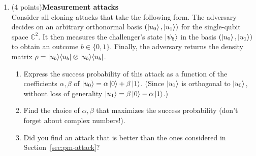 \documentclass[12pt]{article}
\begin{document}
\begin{enumerate}
\item (4 points){\bf Measurement attacks}\\
Consider all cloning attacks that take the following form. The adversary decides on an arbitrary orthonormal basis $(\ket{u_0},\ket{u_1})$ for the single-qubit space $\mathbb{C}^2$. It then measures the challenger's state $\ket{\psi_\$}$ in the basis $(\ket{u_0},\ket{u_1})$ to obtain an outcome $b\in\{0,1\}$. Finally, the adversary returns the density matrix $\rho = \ket{u_b}\!\bra{u_b}\otimes \ket{u_b}\!\bra{u_b}$. 
\begin{enumerate}
\item Express the success probability of this attack as a function of the coefficients $\alpha,\beta$ of $\ket{u_0} = \alpha \ket{0} + \beta\ket{1}$. (Since $\ket{u_1}$ is orthogonal to $\ket{u_0}$, without loss of generality $\ket{u_1} = \beta\ket{0} - \alpha \ket{1}$.) 
\item Find the choice of $\alpha,\beta$ that maximizes the success probability (don't forget about complex numbers!). 
\item Did you find an attack that is better than the ones considered in Section~\ref{sec:pm-attack}? 
\end{enumerate}




\end{enumerate}
\end{document}
